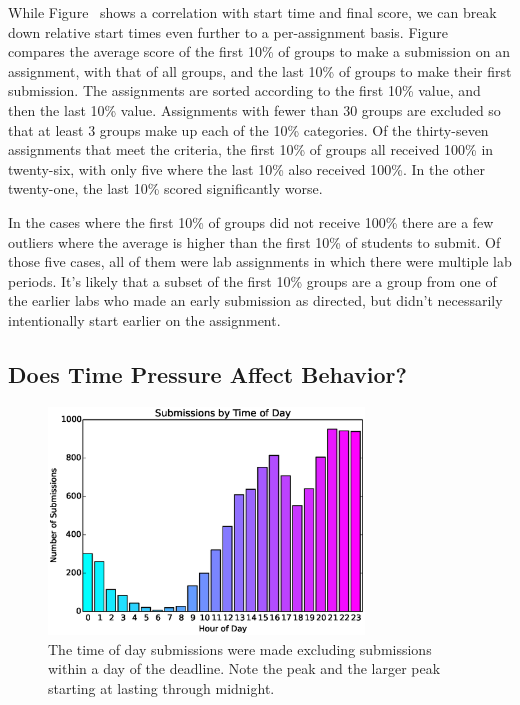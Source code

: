 While Figure~ shows a correlation with start
time and final score, we can break down relative start times even further to a
per-assignment basis. Figure~ compares the average
score of the first 10\% of groups to make a submission on an assignment, with
that of all groups, and the last 10\% of groups to make their first
submission. The assignments are sorted according to the first 10\% value, and
then the last 10\% value. Assignments with fewer than 30 groups are excluded so
that at least 3 groups make up each of the 10\% categories. Of the thirty-seven
assignments that meet the criteria, the first 10\% of groups all received 100\%
in twenty-six, with only five where the last 10\% also received 100\%. In the
other twenty-one, the last 10\% scored significantly worse.

In the cases where the first 10\% of groups did not receive 100\% there are a
few outliers where the average is higher than the first 10\% of students to
submit. Of those five cases, all of them were lab assignments in which there
were multiple lab periods. It's likely that a subset of the first 10\% groups
are a group from one of the earlier labs who made an early submission as
directed, but didn't necessarily intentionally start earlier on the assignment.

\subsection{Does Time Pressure Affect Behavior?}

\begin{figure}[!t]
\centering \includegraphics[width=3.3in]{graphs/Submissions_by_Time_of_Day.eps}
\caption{The time of day submissions were made excluding submissions within a
  day of the deadline. Note the  peak and the larger peak starting at
   lasting through midnight.}
\end{figure}

